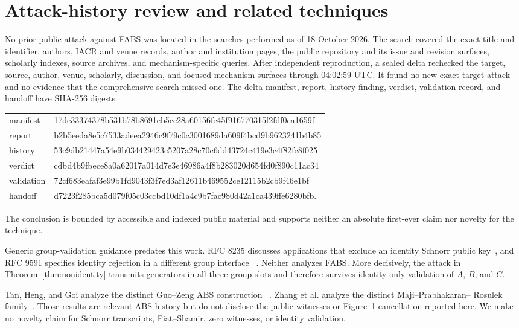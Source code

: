 \documentclass[10pt,a4paper]{article}
\begin{document}
\section{Attack-history review and related techniques}

No prior public attack against FABS was located in the searches performed as
of 18 October 2026. The search covered the exact title and identifier, authors,
IACR and venue records, author and institution pages, the public repository
and its issue and revision surfaces, scholarly indexes, source archives, and
mechanism-specific queries. After independent reproduction, a sealed delta
rechecked the target, source, author, venue, scholarly, discussion, and focused
mechanism surfaces through 04:02:59 UTC. It found no new exact-target attack
and no evidence that the comprehensive search missed one. The delta manifest,
report, history finding, verdict, validation record, and handoff have SHA-256
digests
\begin{center}
\small\ttfamily
\begin{tabular}{@{}ll@{}}
manifest & 17de33374378b531b78b8691eb5cc28a60156fe45f916770315f2fdf0ca1659f\\
report & b2b5eeda8e5c7533adeea2946c9f79c0c3001689da609f4bcd9b9623241b4b85\\
history & 53c9db21447a54e9b034429423c5207a28c70c6dd43724c419e3c4f82fc8f025\\
verdict & cdbd4b9fbece8a0a62017a014d7e3e46986a4f8b283020d654fd0f890c11ac34\\
validation & 72cf683eafaf3e99b1fd9043f3f7ed3af12611b469552ce12115b2cb9f46e1bf\\
handoff & d7223f285bca5d079f05c03ccbd10df1a4c9b7fac980d42a1ca439ffe6280bfb.
\end{tabular}
\end{center}
The conclusion is bounded by accessible and indexed public material and
supports neither an absolute first-ever claim nor novelty for the technique.

Generic group-validation guidance predates this work. RFC 8235 discusses
applications that exclude an identity Schnorr public key~\cite{rfc8235}, and
RFC 9591 specifies identity rejection in a different group interface
~\cite{rfc9591}. Neither analyzes FABS. More decisively, the attack in
Theorem~\ref{thm:nonidentity} transmits generators in all three group slots and
therefore survives identity-only validation of $A$, $B$, and $C$.

Tan, Heng, and Goi analyze the distinct Guo--Zeng ABS construction
~\cite{tanhenggoi}. Zhang et al. analyze the distinct Maji--Prabhakaran--
Rosulek family~\cite{zhangetal}. Those results are relevant ABS history but do
not disclose the public witnesses or Figure~1 cancellation reported here. We
make no novelty claim for Schnorr transcripts, Fiat--Shamir, zero witnesses,
or identity validation.
\end{document}

